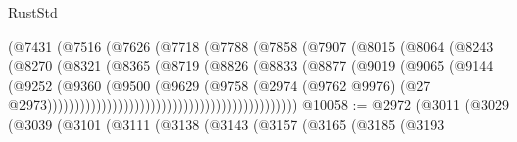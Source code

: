 \begin{lexlean}{RustStd}
\begin{coremodule}
                                          (@7431
                                            (@7516
                                              (@7626
                                                (@7718
                                                  (@7788
                                                    (@7858
                                                      (@7907
                                                        (@8015
                                                          (@8064
                                                            (@8243
                                                              (@8270
                                                                (@8321
                                                                  (@8365
                                                                    (@8719
                                                                      (@8826
                                                                        (@8833
                                                                          (@8877
                                                                            (@9019
                                                                              (@9065
                                                                                (@9144
                                                                                  (@9252
                                                                                    (@9360
                                                                                      (@9500
                                                                                        (@9629
                                                                                          (@9758
                                                                                            (@2974
                                                                                              (@9762
                                                                                                @9976)
                                                                                              (@27
                                                                                                @2973))))))))))))))))))))))))))))))))))))))))))))))
@10058 := @2972
    (@3011
      (@3029
        (@3039
          (@3101
            (@3111
              (@3138
                (@3143
                  (@3157
                    (@3165
                      (@3185
                        (@3193

\end{coremodule}
\end{lexlean}
